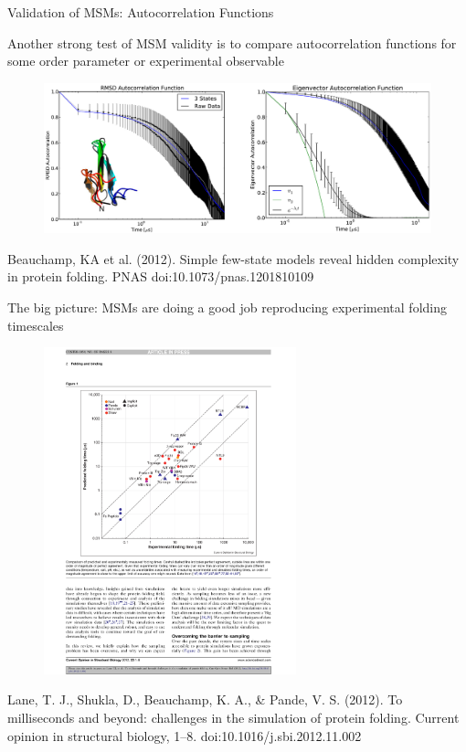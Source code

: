 \documentclass{beamer}
\begin{document}
\begin{frame}{Validation of MSMs: Autocorrelation Functions}

Another strong test of MSM validity is to compare autocorrelation functions for some order parameter or experimental observable

\begin{figure}
\includegraphics[width=1.0\textwidth]{GTT-autocorrelation}
\end{figure}

\tiny
Beauchamp, KA et al. (2012). Simple few-state models reveal hidden complexity in protein folding. PNAS doi:10.1073/pnas.1201810109
\normalsize

\end{frame}


\begin{frame}{The big picture:  MSMs are doing a good job reproducing experimental folding timescales}


\begin{figure}
\includegraphics[width=0.65\textwidth]{MSM-scatter}
\end{figure}

\tiny
Lane, T. J., Shukla, D., Beauchamp, K. A., \& Pande, V. S. (2012). To milliseconds and beyond: challenges in the simulation of protein folding. Current opinion in structural biology, 1–8. doi:10.1016/j.sbi.2012.11.002
\normalsize

\end{frame}
\end{document}
